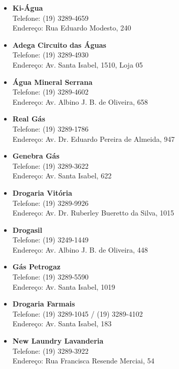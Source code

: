 \begin{itemize}
\item \textbf{Ki-Água}
  \\Telefone: (19) 3289-4659
  \\Endereço: Rua Eduardo Modesto, 240

\item \textbf{Adega Circuito das Águas}
  \\Telefone: (19) 3289-4930
  \\Endereço: Av. Santa Isabel, 1510, Loja 05

\item \textbf{Água Mineral Serrana}
  \\Telefone: (19) 3289-4602
  \\Endereço: Av. Albino J. B. de Oliveira, 658

\item \textbf{Real Gás}
  \\Telefone: (19) 3289-1786
  \\Endereço: Av. Dr. Eduardo Pereira de Almeida, 947

\item \textbf{Genebra Gás}
  \\Telefone: (19) 3289-3622
  \\Endereço: Av. Santa Isabel, 622

\item \textbf{Drogaria Vitória}
  \\Telefone: (19) 3289-9926
  \\Endereço: Av. Dr. Ruberley Bueretto da Silva, 1015

\item \textbf{Drogasil}
  \\Telefone: (19) 3249-1449
  \\Endereço: Av. Albino J. B. de Oliveira, 448

\item \textbf{Gás Petrogaz}
  \\Telefone: (19) 3289-5590
  \\Endereço: Av. Santa Isabel, 1019

\item \textbf{Drogaria Farmais}
  \\Telefone: (19) 3289-1045 / (19) 3289-4102
  \\Endereço: Av. Santa Isabel, 183

\item \textbf{New Laundry Lavanderia}
  \\Telefone: (19) 3289-3922
  \\Endereço: Rua Francisca Resende Merciai, 54


\end{itemize}
